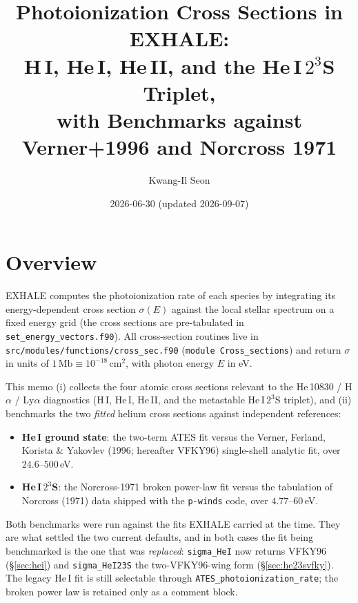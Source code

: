 \documentclass[english,a4paper]{my_memo}
\newcommand{\Mb}{\mathrm{Mb}}
\newcommand{\sig}{\sigma}
\begin{document}
\title{Photoionization Cross Sections in EXHALE:\\
H\,I, He\,I, He\,II, and the He\,I\,$2^3$S Triplet,\\
with Benchmarks against Verner+1996 and Norcross 1971}
\author{Kwang-Il Seon}
\date{2026-06-30 (updated 2026-09-07)}
\maketitle

\tableofcontents
\bigskip

\section{Overview}

EXHALE computes the photoionization rate of each species by integrating
its energy-dependent cross section $\sig(E)$ against the local stellar
spectrum on a fixed energy grid (the cross sections are pre-tabulated in
\texttt{set\_energy\_vectors.f90}). All cross-section routines live in
\texttt{src/modules/functions/cross\_sec.f90} (\texttt{module
Cross\_sections}) and return $\sig$ in units of
$1\,\Mb \equiv 10^{-18}\,\mathrm{cm}^2$, with photon energy $E$ in eV.

This memo (i) collects the four atomic cross sections relevant to the
He\,10830 / H$\alpha$ / Ly$\alpha$ diagnostics (H\,I, He\,I, He\,II, and
the metastable He\,I\,$2^3$S triplet), and (ii) benchmarks the two
\emph{fitted} helium cross sections against independent references:

\begin{itemize}
\item \textbf{He\,I ground state}: the two-term ATES fit versus the Verner,
  Ferland, Korista \& Yakovlev (1996; hereafter VFKY96) single-shell analytic
  fit, over $24.6$--$500\,$eV.
\item \textbf{He\,I\,$2^3$S}: the Norcross-1971 broken power-law fit versus the
  tabulation of Norcross (1971) data shipped with the \texttt{p-winds} code,
  over $4.77$--$60\,$eV.
\end{itemize}

Both benchmarks were run against the fits EXHALE carried at the time. They are
what settled the two current defaults, and in both cases the fit being
benchmarked is the one that was \emph{replaced}: \texttt{sigma\_HeI} now returns
VFKY96 (\S\ref{sec:hei}) and \texttt{sigma\_HeI23S} the two-VFKY96-wing form
(\S\ref{sec:he23svfky}). The legacy He\,I fit is still selectable through
\texttt{ATES\_photoionization\_rate}; the broken power law is retained only as a
comment block.
\end{document}
